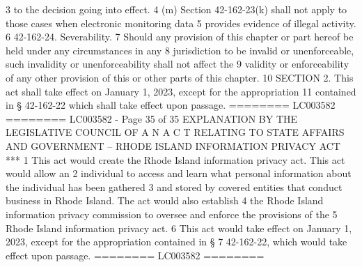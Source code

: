 3 to the decision going into effect.
4 (m) Section 42-162-23(k) shall not apply to those cases when electronic monitoring data
5 provides evidence of illegal activity.
6 42-162-24. Severability.
7 Should any provision of this chapter or part hereof be held under any circumstances in any
8 jurisdiction to be invalid or unenforceable, such invalidity or unenforceability shall not affect the
9 validity or enforceability of any other provision of this or other parts of this chapter.
10 SECTION 2. This act shall take effect on January 1, 2023, except for the appropriation
11 contained in § 42-162-22 which shall take effect upon passage.
========
LC003582
========
LC003582 - Page 35 of 35
EXPLANATION
BY THE LEGISLATIVE COUNCIL
OF
A N A C T
RELATING TO STATE AFFAIRS AND GOVERNMENT – RHODE ISLAND
INFORMATION PRIVACY ACT
***
1 This act would create the Rhode Island information privacy act. This act would allow an
2 individual to access and learn what personal information about the individual has been gathered
3 and stored by covered entities that conduct business in Rhode Island. The act would also establish
4 the Rhode Island information privacy commission to oversee and enforce the provisions of the
5 Rhode Island information privacy act.
6 This act would take effect on January 1, 2023, except for the appropriation contained in §
7 42-162-22, which would take effect upon passage.
========
LC003582
========